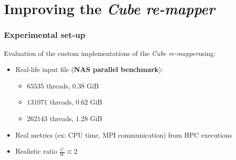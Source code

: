\documentclass[slidestop,xcolor=dvipsnames, notes=hide]{beamer}
\newcommand{\toolTargetSoftware}			{\emph{Cube re-mapper}}
\newcommand{\notationIO}					{I/O}
\begin{document}


\section{Improving the \protect\toolTargetSoftware\space}
		\begin{frame}
			\frametitle{Experimental set-up}
			Evaluation of the custom implementations of the \toolTargetSoftware\space using:
			\begin{itemize}
				\item Real-life input file (\textbf{NAS parallel benchmark}):
					\begin{itemize}
						\item  $65535$ threads, $0.38$ GiB
						\item $131071$ threads, $0.62$ GiB
						\item $262143$ threads, $1.28$ GiB
					\end{itemize}
				\item Real metrics (ex: CPU time, MPI communication) from HPC executions
				\item Realistic ratio $\frac{C}{W} \equiv 2$
			\end{itemize}

		\end{frame}
\end{document}
